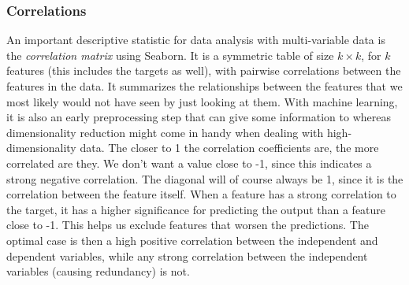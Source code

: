 \documentclass[a4paper, american, 12pt]{report}
\begin{document}
	\subsubsection{Correlations}
	\label{subsubsect:Method-Correlations}
	An important descriptive statistic for data analysis with multi-variable data is the \textit{correlation matrix} using Seaborn. It is a symmetric table of size $k\times k$, for $k$ features (this includes the targets as well), with pairwise correlations between the features in the data. It summarizes the relationships between the features that we most likely would not have seen by just looking at them. With machine learning, it is also an early preprocessing step that can give some information to whereas dimensionality reduction might come in handy when dealing with high-dimensionality data. The closer to 1 the correlation coefficients are, the more correlated are they. We don't want a value close to -1, since this indicates a strong negative correlation. The diagonal will of course always be 1, since it is the correlation between the feature itself. When a feature has a strong correlation to the target, it has a higher significance for predicting the output than a feature close to -1. This helps us exclude features that worsen the predictions. The optimal case is then a high positive correlation between the independent and dependent variables, while any strong correlation between the independent variables (causing redundancy) is not.
	
\end{document}
